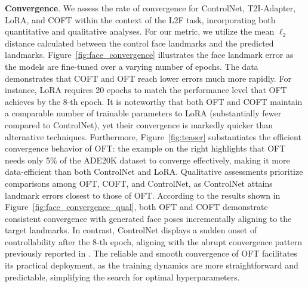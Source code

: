 {\textbf{Convergence}. We assess the rate of convergence for ControlNet, T2I-Adapter, LoRA, and COFT within the context of the L2F task, incorporating both quantitative and qualitative analyses. For our metric, we utilize the mean $\ell_2$ distance calculated between the control face landmarks and the predicted landmarks. Figure~\ref{fig:face_convergence} illustrates the face landmark error as the models are fine-tuned over a varying number of epochs. The data demonstrates that COFT and OFT reach lower errors much more rapidly. For instance, LoRA requires 20 epochs to match the performance level that OFT achieves by the 8-th epoch. It is noteworthy that both OFT and COFT maintain a comparable number of trainable parameters to LoRA (substantially fewer compared to ControlNet), yet their convergence is markedly quicker than alternative techniques. Furthermore, Figure~\ref{fig:teaser} substantiates the efficient convergence behavior of OFT: the example on the right highlights that OFT needs only 5\% of the ADE20K dataset to converge effectively, making it more data-efficient than both ControlNet and LoRA. Qualitative assessments prioritize comparisons among OFT, COFT, and ControlNet, as ControlNet attains landmark errors closest to those of OFT. According to the results shown in Figure~\ref{fig:face_convergence_qual}, both OFT and COFT demonstrate consistent convergence with generated face poses incrementally aligning to the target landmarks. In contrast, ControlNet displays a sudden onset of controllability after the 8-th epoch, aligning with the abrupt convergence pattern previously reported in \cite{zhang2023adding}. The reliable and smooth convergence of OFT facilitates its practical deployment, as the training dynamics are more straightforward and predictable, simplifying the search for optimal hyperparameters.

}
